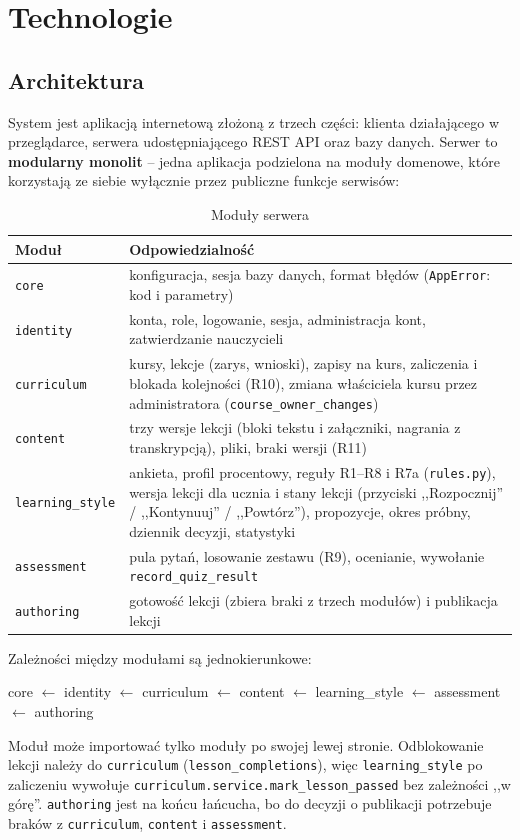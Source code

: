 \section{Technologie}

\subsection{Architektura}
\label{sec:architecture}

System jest aplikacją internetową złożoną z trzech części: klienta działającego w przeglądarce, serwera udostępniającego REST API oraz bazy danych. Serwer to \textbf{modularny monolit} -- jedna aplikacja podzielona na moduły domenowe, które korzystają ze siebie wyłącznie przez publiczne funkcje serwisów:

\begin{table}[H]
\centering
\begin{tabular}{|l|p{10cm}|}
\hline
\textbf{Moduł} & \textbf{Odpowiedzialność} \\ \hline
\texttt{core} & konfiguracja, sesja bazy danych, format błędów (\texttt{AppError}: kod i parametry) \\ \hline
\texttt{identity} & konta, role, logowanie, sesja, administracja kont, zatwierdzanie nauczycieli \\ \hline
\texttt{curriculum} & kursy, lekcje (zarys, wnioski), zapisy na kurs, zaliczenia i blokada kolejności (R10), zmiana właściciela kursu przez administratora (\texttt{course\_owner\_changes}) \\ \hline
\texttt{content} & trzy wersje lekcji (bloki tekstu i załączniki, nagrania z transkrypcją), pliki, braki wersji (R11) \\ \hline
\texttt{learning\_style} & ankieta, profil procentowy, reguły R1--R8 i R7a (\texttt{rules.py}), wersja lekcji dla ucznia i stany lekcji (przyciski ,,Rozpocznij'' / ,,Kontynuuj'' / ,,Powtórz''), propozycje, okres próbny, dziennik decyzji, statystyki \\ \hline
\texttt{assessment} & pula pytań, losowanie zestawu (R9), ocenianie, wywołanie \texttt{record\_quiz\_result} \\ \hline
\texttt{authoring} & gotowość lekcji (zbiera braki z trzech modułów) i publikacja lekcji \\ \hline
\end{tabular}
\caption{Moduły serwera}
\end{table}

Zależności między modułami są jednokierunkowe:
\begin{center}
\small\ttfamily
core $\leftarrow$ identity $\leftarrow$ curriculum $\leftarrow$ content $\leftarrow$ learning\_style $\leftarrow$ assessment $\leftarrow$ authoring
\end{center}
Moduł może importować tylko moduły po swojej lewej stronie. Odblokowanie lekcji należy do \texttt{curriculum} (\texttt{lesson\_completions}), więc \texttt{learning\_style} po zaliczeniu wywołuje \texttt{curriculum.service.mark\_lesson\_passed} bez zależności ,,w górę''. \texttt{authoring} jest na końcu łańcucha, bo do decyzji o publikacji potrzebuje braków z \texttt{curriculum}, \texttt{content} i \texttt{assessment}.

